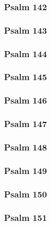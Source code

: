 \documentclass[10pt]{extarticle}
\begin{document}
\begin{multicols}{2}
\subsubsection{Psalm 142}

\newpage

\subsubsection{Psalm 143}

\newpage

\subsubsection{Psalm 144}

\newpage

\subsubsection{Psalm 145}

\newpage

\subsubsection{Psalm 146}

\newpage

\subsubsection{Psalm 147}

\newpage

\subsubsection{Psalm 148}

\newpage

\subsubsection{Psalm 149}

\newpage

\subsubsection{Psalm 150}

\newpage

\subsubsection{Psalm 151}

\newpage

\end{multicols}
\end{document}
